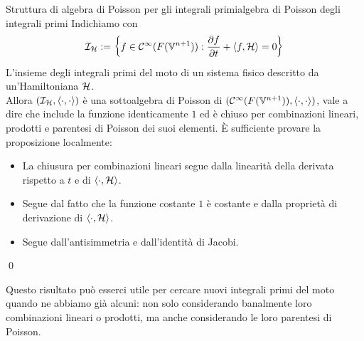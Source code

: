 \documentclass[openany]{book}
\renewcommand\C{\mc{C}}
\renewcommand\V{\mathbb{V}}
\begin{document}
\begin{theorem}{Struttura di algebra di Poisson per gli integrali primi}{algebra di Poisson degli integrali primi}
    Indichiamo con 
    \[ \I_\H := \left\{ f \in \C^{\infty}(F(\V^{n+1})) : \frac{\partial f}{\partial t} + \langle f,\H \rangle = 0 \right\} \]
    L'insieme degli integrali primi del moto di un sistema fisico descritto da un'Hamiltoniana $\mathcal{H}$.\\
    Allora $(\mathcal{I}_{\mathcal{H}}, \langle\cdot,\cdot\rangle )$ è una sottoalgebra di Poisson di $(\C^{\infty}(F(\V^{n+1})), \langle\cdot,\cdot\rangle )$, vale a dire che include la funzione identicamente $1$ ed è chiuso per combinazioni lineari, prodotti e parentesi di Poisson dei suoi elementi.
    \proof 
    È sufficiente provare la proposizione localmente:\begin{itemize}
        \item La chiusura per combinazioni lineari segue dalla linearità della derivata rispetto a $t$ e di $\langle \cdot , \mathcal{H}\rangle$.
        \item Segue dal fatto che la funzione costante $1$ è costante e dalla proprietà di derivazione di $\langle \cdot , \mathcal{H}\rangle$.
        \item Segue dall'antisimmetria e dall'identità di Jacobi.
    \end{itemize}
    \qed
\end{theorem}

Questo risultato può esserci utile per cercare nuovi integrali primi del moto quando ne abbiamo già alcuni: non solo considerando banalmente loro combinazioni lineari o prodotti, ma anche considerando le loro parentesi di Poisson.

\nocite{*}
\printbibliography
\end{document}
